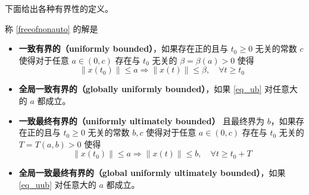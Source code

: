 下面给出各种有界性的定义。

\begin{definition}
称 \eqref{freeofnonauto} 的解是
\begin{itemize}[leftmargin=1em]
    \item \textbf{一致有界的（uniformly bounded）}，如果存在正的且与 $t_0 \geq 0$ 无关的常数 $c$ 使得对于任意 $a \in (0, c)$ 存在与 $t_0$ 无关的 $\beta = \beta(a) > 0$ 使得
    \begin{equation} \label{eq_ub}
        \| x (t_0) \| \leq a \Rightarrow \| x (t) \| \leq \beta, \quad \forall t \geq t_0
    \end{equation}
    \item \textbf{全局一致有界的（globally uniformly bounded）}，如果 \eqref{eq_ub} 对任意大的 $a$ 都成立。
    \item \textbf{一致最终有界的（uniformly ultimately bounded）} 且最终界为 $b$，如果存在正的且与 $t_0 \geq 0$ 无关的常数 $b, c$ 使得对于任意 $a \in (0, c)$ 存在与 $t_0$ 无关的 $T = T (a, b) > 0$ 使得
    \begin{equation} \label{eq_uub}
        \| x (t_0) \| \leq a \Rightarrow \| x (t) \| \leq b, \quad \forall t \geq t_0 + T
    \end{equation}
    \item \textbf{全局一致最终有界的（global uniformly ultimately bounded）}，如果 \eqref{eq_uub} 对任意大的 $a$ 都成立。
\end{itemize}
\end{definition}

